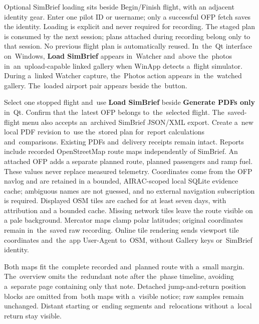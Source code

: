 \documentclass[11pt,a4paper]{article}
\newcommand{\ui}[1]{\textbf{#1}}
\begin{document}
Optional SimBrief loading sits beside Begin/Finish flight, with an adjacent
identity gear. Enter one pilot ID or username; only a successful OFP fetch saves
the identity. Loading is explicit and never required for recording. The staged
plan is consumed by the next session; plans attached during recording belong
only to that session. No previous flight plan is automatically reused.
In~the~Qt interface on~Windows, \ui{Load SimBrief} appears in~Watcher
and~above the~photos in~an~upload-capable linked gallery when WinApp detects
a~flight simulator. During a~linked Watcher capture, the~Photos action appears
in~the~watched gallery. The~loaded airport pair appears beside the~button.

Select one stopped flight and~use \ui{Load SimBrief} beside
\ui{Generate PDFs only} in~Qt. Confirm that the~latest OFP belongs to~the~selected
flight. The~saved-flight menu also accepts an~archived SimBrief JSON/XML export.
Create a~new local PDF revision to~use the~stored plan for~report calculations
and~comparisons. Existing PDFs and~delivery receipts remain intact.
Reports include recorded OpenStreetMap route maps independently of SimBrief.
An attached OFP adds a separate planned route, planned passengers and ramp fuel.
These values never replace measured telemetry. Coordinates come from the OFP
navlog and are retained in a bounded, AIRAC-scoped local SQLite evidence cache;
ambiguous names are not guessed, and no external navigation subscription is
required. Displayed OSM tiles are cached for at least seven days, with
attribution
and a bounded cache. Missing network tiles leave the route visible on a pale
background. Mercator maps clamp polar latitudes; original coordinates remain
in~the~saved raw recording. Online tile rendering sends viewport tile
coordinates
and~the~app User-Agent to~OSM, without Gallery keys or~SimBrief identity.

Both maps fit the~complete recorded and~planned route with a~small margin.
The~overview omits the~redundant note after the~phase timeline, avoiding
a~separate page containing only that note.
Detached jump-and-return position blocks are omitted from~both maps
with a~visible notice; raw samples remain unchanged. Distant starting
or~ending segments and~relocations without a~local return stay visible.
\end{document}
